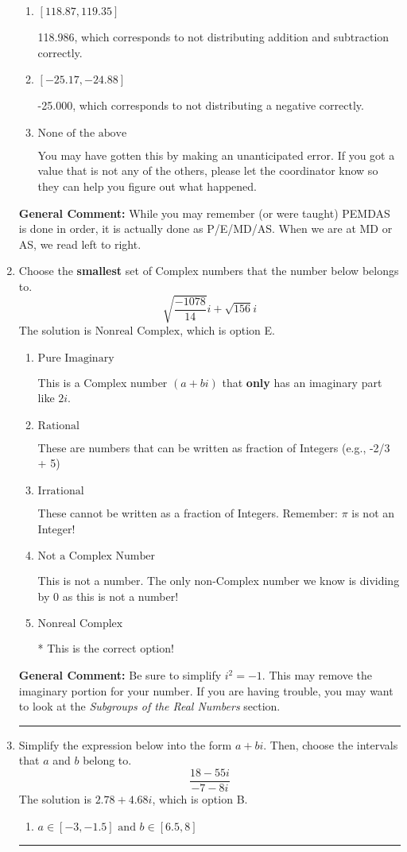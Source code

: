 \documentclass{extbook}[14pt]
\newcommand{\litem}[1]{\item #1

\rule{\textwidth}{0.4pt}}
\begin{document}
\begin{enumerate}
{\begin{enumerate}[label=\Alph*.]
 -101.014, which corresponds to an Order of Operations error: not reading left-to-right for multiplication/division.
\item \( [118.87, 119.35] \)

 118.986, which corresponds to not distributing addition and subtraction correctly.
\item \( [-25.17, -24.88] \)

 -25.000, which corresponds to not distributing a negative correctly.
\item \( \text{None of the above} \)

 You may have gotten this by making an unanticipated error. If you got a value that is not any of the others, please let the coordinator know so they can help you figure out what happened.
\end{enumerate}

\textbf{General Comment:} While you may remember (or were taught) PEMDAS is done in order, it is actually done as P/E/MD/AS. When we are at MD or AS, we read left to right.
}
\litem{
Choose the \textbf{smallest} set of Complex numbers that the number below belongs to.
\[ \sqrt{\frac{-1078}{14}} i+\sqrt{156}i \]
The solution is \( \text{Nonreal Complex} \), which is option E.\begin{enumerate}[label=\Alph*.]
\item \( \text{Pure Imaginary} \)

This is a Complex number $(a+bi)$ that \textbf{only} has an imaginary part like $2i$.
\item \( \text{Rational} \)

These are numbers that can be written as fraction of Integers (e.g., -2/3 + 5)
\item \( \text{Irrational} \)

These cannot be written as a fraction of Integers. Remember: $\pi$ is not an Integer!
\item \( \text{Not a Complex Number} \)

This is not a number. The only non-Complex number we know is dividing by 0 as this is not a number!
\item \( \text{Nonreal Complex} \)

* This is the correct option!
\end{enumerate}

\textbf{General Comment:} Be sure to simplify $i^2 = -1$. This may remove the imaginary portion for your number. If you are having trouble, you may want to look at the \textit{Subgroups of the Real Numbers} section.
}
\litem{
Simplify the expression below into the form $a+bi$. Then, choose the intervals that $a$ and $b$ belong to.
\[ \frac{18 - 55 i}{-7 - 8 i} \]
The solution is \( 2.78  + 4.68 i \), which is option B.\begin{enumerate}[label=\Alph*.]
\item \( a \in [-3, -1.5] \text{ and } b \in [6.5, 8] \)


\end{enumerate}}
\end{enumerate}
\end{document}
